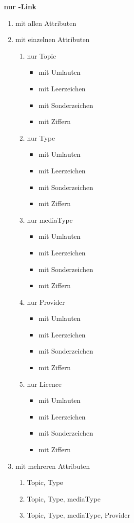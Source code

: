 \pagebreak


\flushleft \textbf{nur \SEARCH-Link}

\begin{enumerate}
  \item mit allen Attributen
  \item mit einzelnen Attributen

   \begin{enumerate}
    \item nur Topic  
    \begin{itemize}
    \item mit Umlauten
    \item mit Leerzeichen
    \item mit Sonderzeichen
    \item mit Ziffern
\end{itemize}
	\item nur Type
 	\begin{itemize}
    \item mit Umlauten
    \item mit Leerzeichen
    \item mit Sonderzeichen
    \item mit Ziffern
\end{itemize}
	\item nur mediaType
	\begin{itemize}
    \item mit Umlauten
    \item mit Leerzeichen
    \item mit Sonderzeichen
    \item mit Ziffern
    \end{itemize}
    \item nur Provider
	\begin{itemize}
    \item mit Umlauten
    \item mit Leerzeichen
    \item mit Sonderzeichen
    \item mit Ziffern
    \end{itemize}
    \item nur Licence
	\begin{itemize}
    \item mit Umlauten
    \item mit Leerzeichen
    \item mit Sonderzeichen
    \item mit Ziffern
    \end{itemize}
\end{enumerate}
\item mit mehreren Attributen
\begin{enumerate}
    \item Topic, Type
	 \item Topic, Type, mediaType
	 \item Topic, Type, mediaType, Provider
\end{enumerate}
\end{enumerate}

